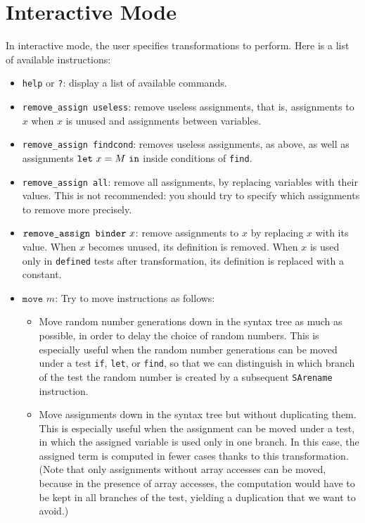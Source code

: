 \documentclass{article}
\begin{document}
\fussy

\section{Interactive Mode}\label{sec:interact}

In interactive mode, the user specifies transformations to perform.
Here is a list of available instructions:
\begin{itemize}

\item \texttt{help} or \texttt{?}: display a list of available commands.

\item \texttt{remove\string_assign useless}: remove useless assignments,
that is, assignments to $x$ when $x$ is unused and assignments
between variables.

\item \texttt{remove\string_assign findcond}: removes useless assignments,
as above, as well as assignments ${\tt let}\ x = M\ {\tt in}$ inside
conditions of {\tt find}. 

\item \texttt{remove\string_assign all}: remove all assignments,
by replacing variables with their values. This is not recommended:
you should try to specify which assignments to remove more precisely.

\item $\texttt{remove\string_assign binder}\ x$: remove assignments
to $x$ by replacing $x$ with its value. When $x$ becomes unused,
its definition is removed. When $x$ is used only in \texttt{defined} 
tests after transformation, its definition is replaced with 
a constant.

\item $\texttt{move }m$: Try to move instructions as follows:
\begin{itemize}

\item Move random number generations down in the syntax tree as much
  as possible, in order to delay the choice of random numbers. This is
  especially useful when the random number generations can be moved
  under a test {\tt if}, {\tt let}, or {\tt find}, so that we can
  distinguish in which branch of the test the random number is created
  by a subsequent \texttt{SArename} instruction.

\item Move assignments down in the syntax tree but without duplicating
  them. This is especially useful when the assignment can be moved
  under a test, in which the assigned variable is used only in one
  branch. In this case, the assigned term is computed in fewer cases
  thanks to this transformation.
  (Note that only assignments without array accesses can be moved,
  because in the presence of array accesses, the computation would have
  to be kept in all branches of the test, yielding a duplication that 
  we want to avoid.)


\end{itemize}
\end{itemize}
\end{document}
